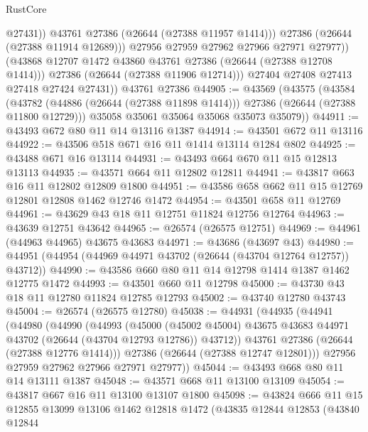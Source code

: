 \begin{lexlean}{RustCore}
\begin{coremodule}
                      @27431))
                  @43761
                  @27386
                  (@26644 (@27388 @11957 @1414)))
                @27386
                (@26644 (@27388 @11914 @12689)))
              @27956
              @27959
              @27962
              @27966
              @27971
              @27977))
          (@43868 @12707 @1472 @43860 @43761 @27386 (@26644 (@27388 @12708 @1414)))
          @27386
          (@26644 (@27388 @11906 @12714)))
        @27404
        @27408
        @27413
        @27418
        @27424
        @27431))
    @43761
    @27386
@44905 := @43569
    (@43575
      (@43584
        (@43782 (@44886 (@26644 (@27388 @11898 @1414))) @27386 (@26644 (@27388 @11800 @12729)))
        @35058
        @35061
        @35064
        @35068
        @35073
        @35079))
@44911 := @43493 @672 @80 @11 @14 @13116 @1387
@44914 := @43501 @672 @11 @13116
@44922 := @43506 @518 @671 @16 @11 @1414 @13114 @1284 @802
@44925 := @43488 @671 @16 @13114
@44931 := @43493 @664 @670 @11 @15 @12813 @13113
@44935 := @43571 @664 @11 @12802 @12811
@44941 := @43817 @663 @16 @11 @12802 @12809 @1800
@44951 := @43586 @658 @662 @11 @15 @12769 @12801 @12808 @1462 @12746 @1472
@44954 := @43501 @658 @11 @12769
@44961 := @43629 @43 @18 @11 @12751 @11824 @12756 @12764
@44963 := @43639 @12751 @43642
@44965 := @26574 (@26575 @12751)
@44969 := @44961 (@44963 @44965) @43675 @43683
@44971 := @43686 (@43697 @43)
@44980 := @44951 (@44954 (@44969 @44971 @43702 (@26644 (@43704 @12764 @12757)) @43712))
@44990 := @43586 @660 @80 @11 @14 @12798 @1414 @1387 @1462 @12775 @1472
@44993 := @43501 @660 @11 @12798
@45000 := @43730 @43 @18 @11 @12780 @11824 @12785 @12793
@45002 := @43740 @12780 @43743
@45004 := @26574 (@26575 @12780)
@45038 := @44931
    (@44935
      (@44941
        (@44980
          (@44990
            (@44993
              (@45000
                (@45002 @45004)
                @43675
                @43683
                @44971
                @43702
                (@26644 (@43704 @12793 @12786))
                @43712))
            @43761
            @27386
            (@26644 (@27388 @12776 @1414)))
          @27386
          (@26644 (@27388 @12747 @12801)))
        @27956
        @27959
        @27962
        @27966
        @27971
        @27977))
@45044 := @43493 @668 @80 @11 @14 @13111 @1387
@45048 := @43571 @668 @11 @13100 @13109
@45054 := @43817 @667 @16 @11 @13100 @13107 @1800
@45098 := @43824
    @666
    @11
    @15
    @12855
    @13099
    @13106
    @1462
    @12818
    @1472
    (@43835
      @12844
      @12853
      (@43840
        @12844

\end{coremodule}
\end{lexlean}

